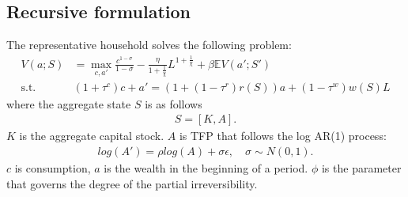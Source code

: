 \subsection*{Recursive formulation}
The representative household solves the following problem:
\begin{align*}
  V(a;S) &= \max_{c,a'} \frac{c^{1-\sigma}}{1-\sigma} - 
  \frac{\eta}{1+\frac{1}{\chi}}L^{1+\frac{1}{\chi}}+ \beta \mathbb{E}V(a';S')
  \\
  \text{s.t. }& 
  (1+\tau^{c})c+a' = (1+(1-\tau^{r})r(S))a + (1-\tau^{w})w(S)L
\end{align*}
where the aggregate state $S$ is as follows
\begin{align*}
  S = [K,A].
\end{align*}
$K$ is the aggregate capital stock. $A$ is TFP that follows the log AR(1) process:
\begin{align*}
  log(A') = \rho log(A) + \sigma\epsilon,\quad\sigma\sim N(0,1).
\end{align*}
$c$ is consumption, $a$ is the wealth in the beginning of a period. $\phi$ is the parameter that governs the degree of the partial irreversibility.

